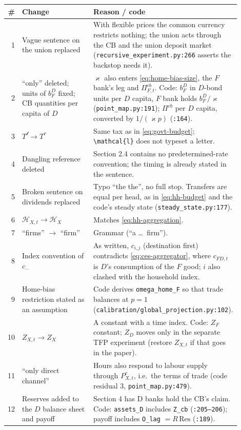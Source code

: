 \documentclass[11pt]{article}
\begin{document}
\begin{longtable}{@{}r p{0.40\linewidth} p{0.50\linewidth}@{}}
\toprule
\# & Change & Reason / code \\
\midrule\endhead
1 & Vague sentence on the union replaced & With flexible prices the common currency restricts nothing; the union acts through the CB and the union deposit market (\texttt{recursive\_experiment.py:266} asserts the backstop needs it). \\
2 & ``only'' deleted; units of $b^D_F$ fixed; CB quantities per capita of $D$ & $\varkappa$ also enters \eqref{eq:home-bias-size}, the $F$ bank's leg and $\Pi^{cb}_{F,t}$. Code: $b^D_F$ in $D$-bond units per $D$ capita, $F$ bank holds $b^D_F/\varkappa$ (\texttt{point\_map.py:191}); $\Pi^{cb}$ per $D$ capita, converted by $1/(\varkappa p)$ (\texttt{:164}). \\
3 & $T^{\mathcal{l}}\to T^{\tau}$ & Same tax as in \eqref{eq:govt-budget}; \verb|\mathcal{l}| does not typeset a letter. \\
4 & Dangling reference deleted & Section 2.4 contains no predetermined-rate convention; the timing is already stated in the sentence. \\
5 & Broken sentence on dividends replaced & Typo ``the the'', no full stop. Transfers are equal per head, as in \eqref{eq:hh-budget} and the code's steady state (\texttt{steady\_state.py:177}). \\
6 & $\mathcal{H}_{X,t}\to\mathcal{H}_X$ & Matches \eqref{eq:hh-aggregation}. \\
7 & ``firms'' $\to$ ``firm'' & Grammar (``a \dots\ firm''). \\
8 & Index convention of $c_{\cdot\cdot}$ & As written, $c_{i,j}$ (destination first) contradicts \eqref{eq:ces-aggregator}, where $c_{FD,t}$ is $D$'s consumption of the $F$ good; $i$ also clashed with the household index. \\
9 & Home-bias restriction stated as an assumption & Code derives \texttt{omega\_home\_F} so that trade balances at $p=1$ (\texttt{calibration/global\_projection.py:102}). \\
10 & $Z_{X,t}\to Z_X$ & A constant with a time index. Code: $Z_F$ constant; $Z_D$ moves only in the separate TFP experiment (restore $Z_{X,t}$ if that goes in the paper). \\
11 & ``only direct channel'' & Hours also respond to labour supply through $P^c_{X,t}$, i.e.\ the terms of trade (code residual 3, \texttt{point\_map.py:479}). \\
12 & Reserves added to the $D$ balance sheet and payoff & Section 4 has D banks hold the CB's claim. Code: \texttt{assets\_D} includes \texttt{Z\_cb} (\texttt{:205--206}); payoff includes \texttt{O\_lag} $=R\,\mathrm{Res}$ (\texttt{:189}). \\

\end{longtable}
\end{document}
